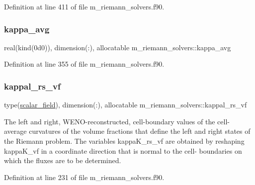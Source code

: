Definition at line 411 of file m\+\_\+riemann\+\_\+solvers.\+f90.

\mbox{\label{namespacem__riemann__solvers_aa6e6b00985be177b0a4a92f1aed48629}} 
\subsubsection{\texorpdfstring{kappa\+\_\+avg}{kappa\_avg}}
{\footnotesize\ttfamily real(kind(0d0)), dimension(\+:), allocatable m\+\_\+riemann\+\_\+solvers\+::kappa\+\_\+avg}



Definition at line 355 of file m\+\_\+riemann\+\_\+solvers.\+f90.

\mbox{\label{namespacem__riemann__solvers_ac277f9426d7112e2b42fdc0fd6583f5e}} 
\subsubsection{\texorpdfstring{kappal\+\_\+rs\+\_\+vf}{kappal\_rs\_vf}}
{\footnotesize\ttfamily type(\hyperlink{structm__derived__types_1_1scalar__field}{scalar\+\_\+field}), dimension(\+:), allocatable m\+\_\+riemann\+\_\+solvers\+::kappal\+\_\+rs\+\_\+vf}



The left and right, W\+E\+N\+O-\/reconstructed, cell-\/boundary values of the cell-\/ average curvatures of the volume fractions that define the left and right states of the Riemann problem. The variables kappa\+K\+\_\+rs\+\_\+vf are obtained by reshaping kappa\+K\+\_\+vf in a coordinate direction that is normal to the cell-\/ boundaries on which the fluxes are to be determined. 



Definition at line 231 of file m\+\_\+riemann\+\_\+solvers.\+f90.

\mbox{\label{namespacem__riemann__solvers_ae8a2bf891d899a2441210a29da0e03a1}} 
